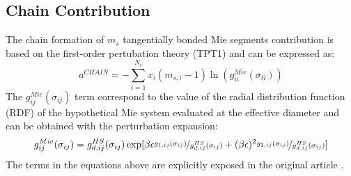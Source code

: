 \subsection{Chain Contribution}
The chain formation of $m_{s}$ tangentially bonded Mie segments contribution is based on the first-order pertubation theory (TPT1)  \cite{papa2014} and can be expressed as:
\begin{equation}
a^{CHAIN} =-\sum_{i=1}^{N_{c}} x_{i}(m_{s,i} - 1)\ln(g_{ii}^{Mie}(\sigma_{ii}))
\label{eqn:achain}
\end{equation}
The $g_{ij}^{Mie}(\sigma_{ij})$ term correspond to the value of the radial distribution function (RDF) of the hypothetical Mie system evaluated at the effective diameter and can be obtained with the perturbation expansion:
\begin{equation}
g_{ij}^{Mie}(\sigma_{ij}) =g_{d,ij}^{HS}(\sigma_{ij})\exp[\beta\epsilon \nicefrac{g_{1,ij}(\sigma_{ij})}{g_{d,ij}^{HS}(\sigma_{ij})} + (\beta\epsilon)^2 \nicefrac{g_{2,ij}(\sigma_{ij})}{g_{d,ij}^{HS}(\sigma_{ij})}]
\label{eqn:achain}
\end{equation}
The terms in the equations above are explicitly exposed in the original article \cite{lafitte2013}. 
